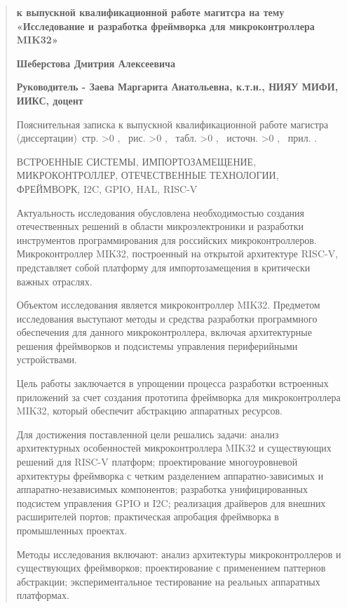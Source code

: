 \begin{abstract}
\begin{center}
\textbf{к выпускной квалификационной работе магитсра на тему «Исследование и разработка фреймворка для микроконтроллера MIK32»}

\textbf{Шеберстова Дмитрия Алексеевича}

\textbf{Руководитель - Заева Маргарита Анатольевна, к.т.н., НИЯУ МИФИ, ИИКС, доцент}

\end{center}

    Пояснительная записка к выпускной квалификационной работе магистра (диссертации) \pageref{LastPage}\,стр.%
    \ifnum \totfig >0
    , \totfig~рис.%
    \fi
    \ifnum \tottab >0
    , \tottab~табл.%
    \fi
    \ifnum \totbib >0
    , \totbib~источн.%
    \fi
    \ifnum \totapp >0
    , \totapp~прил.%
    \else
    .%
    \fi

ВСТРОЕННЫЕ СИСТЕМЫ, ИМПОРТОЗАМЕЩЕНИЕ, МИКРОКОНТРОЛЛЕР, ОТЕЧЕСТВЕННЫЕ ТЕХНОЛОГИИ, ФРЕЙМВОРК, I2C, GPIO, HAL, RISC-V

Актуальность исследования обусловлена необходимостью создания отечественных решений в области микроэлектроники и разработки инструментов программирования для российских микроконтроллеров. Микроконтроллер MIK32, построенный на открытой архитектуре RISC-V, представляет собой платформу для импортозамещения в критически важных отраслях.

Объектом исследования является микроконтроллер MIK32. Предметом исследования выступают методы и средства разработки программного обеспечения для данного микроконтроллера, включая архитектурные решения фреймворков и подсистемы управления периферийными устройствами.

Цель работы заключается в упрощении процесса разработки встроенных приложений за счет создания прототипа фреймворка для микроконтроллера MIK32, который обеспечит абстракцию аппаратных ресурсов.

Для достижения поставленной цели решались задачи: анализ архитектурных особенностей микроконтроллера MIK32 и существующих решений для RISC-V платформ; проектирование многоуровневой архитектуры фреймворка с четким разделением аппаратно-зависимых и аппаратно-независимых компонентов; разработка унифицированных подсистем управления GPIO и I2C; реализация драйверов для внешних расширителей портов; практическая апробация фреймворка в промышленных проектах.

Методы исследования включают: анализ архитектуры микроконтроллеров и существующих фреймворков; проектирование с применением паттернов абстракции; экспериментальное тестирование на реальных аппаратных платформах.


\end{abstract}
